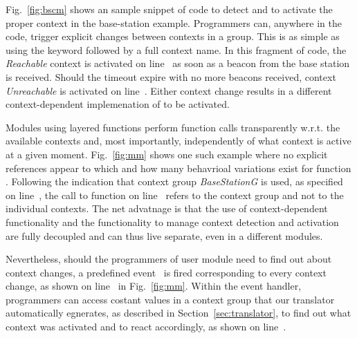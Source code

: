 Fig.~\ref{fig:bscm} shows an sample snippet of code to detect and to
activate the proper context in the base-station example. Programmers
can, anywhere in the code, trigger explicit changes between contexts
in a group. This is as simple as using the  keyword
followed by a full context name. In this fragment of code, the
\emph{Reachable} context is activated on line~ as soon
as a beacon from the base station is received. Should the timeout
expire with no more beacons received, context \emph{Unreachable} is
activated on line~. Either context change results in a
different context-dependent implemenation of  to be
activated.


Modules using layered functions perform function calls transparently
w.r.t. the available contexts and, most importantly, independently of
what context is active at a given moment. Fig.~\ref{fig:mm} shows one
such example where no explicit references appear to which and how many
behavrioal variations exist for function . Following
the indication that context group \emph{BaseStationG} is used, as
specified on line~, the call to function 
on line~ refers to the context group and not to the
individual contexts. The net advatnage is that the use of
context-dependent functionality and the functionality to manage
context detection and activation are fully decoupled and can thus live
separate, even in a different modules.


Nevertheless, should the programmers of user module need to find out
about context changes, a predefined event~ is
fired corresponding to every context change, as shown on line~ in
Fig.~\ref{fig:mm}. %
Within the event handler, programmers can access costant values in a
context group that our translator automatically egnerates, as
described in Section~\ref{sec:translator}, to find out what context
was activated and to react accordingly, as shown on
line~.



